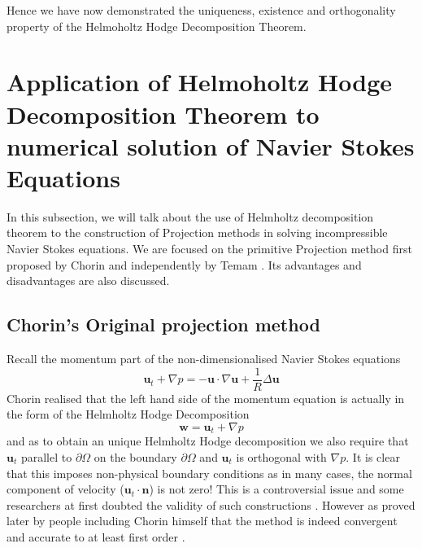 Hence we have now demonstrated the uniqueness, existence and orthogonality property of the Helmoholtz Hodge Decomposition Theorem.

\newpage
\section[Application of HHD Theorem to N-S equation]{Application of Helmoholtz Hodge Decomposition Theorem to numerical solution of Navier Stokes Equations}
In this subsection, we will talk about the use of Helmholtz decomposition theorem to the construction of Projection methods in solving incompressible Navier Stokes equations. We are focused on the primitive Projection method first proposed by Chorin and independently by Temam \cite{chorin1968numerical,temam1969approximation,brown2001accurate}. Its advantages and disadvantages are also discussed.\\

\subsection{Chorin's Original projection method}
Recall the momentum part of the non-dimensionalised Navier Stokes equations
\begin{equation}\label{eq:momentum equation}
\textbf{u}_t + \nabla \textit{p} = - \textbf{u} \cdot \nabla \textbf{u} + \dfrac{1}{R} \Delta \textbf{u}
\end{equation}
Chorin realised that the left hand side of the momentum equation is actually in the form of the Helmholtz Hodge Decomposition \cite{chorin1968numerical,chorin1990mathematical,brown2001accurate}
\begin{equation}
\textbf{w} = \textbf{u}_t + \nabla \textit{p} 
\end{equation}
and as to obtain an unique Helmholtz Hodge decomposition we also require that $\textbf{u}_t$ parallel to $\partial \Omega$ on the boundary $\partial \Omega$ and $\textbf{u}_t$ is orthogonal with $\nabla p$. It is clear that this imposes non-physical boundary conditions as in many cases, the normal component of velocity ($\textbf{u}_t \cdot \textbf{n}$) is not zero! This is a controversial issue and some researchers at first doubted the validity of such constructions \cite{perot1993analysis,brown2001accurate,shen1992error}. However as proved later by people including Chorin himself that the method is indeed convergent and accurate to at least first order \cite{chorin1969convergence,shen1992error,rannacher1992chorin,perot1993analysis,brown2001accurate}. 

